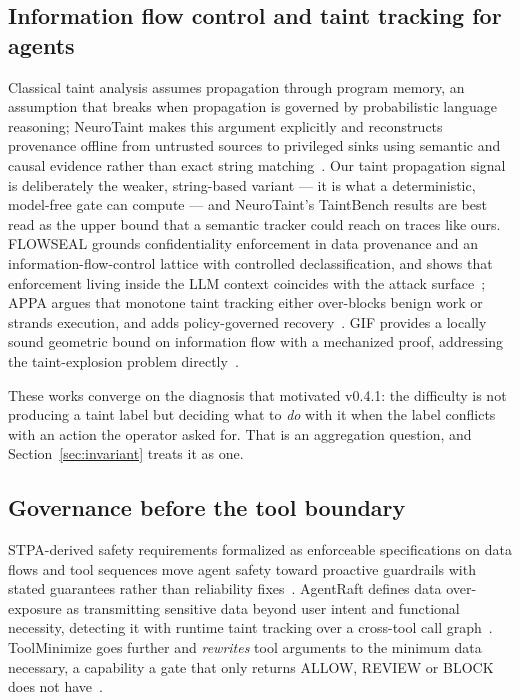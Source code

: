 \documentclass[letterpaper,twocolumn,10pt]{article}
\begin{document}
\subsection{Information flow control and taint tracking for agents}
\label{sec:rw:ifc}

Classical taint analysis assumes propagation through program memory, an
assumption that breaks when propagation is governed by probabilistic language
reasoning; NeuroTaint makes this argument explicitly and reconstructs
provenance offline from untrusted sources to privileged sinks using semantic
and causal evidence rather than exact string matching~\cite{cai2026ghost}. Our
taint propagation signal is deliberately the weaker, string-based variant ---
it is what a deterministic, model-free gate can compute --- and NeuroTaint's
TaintBench results are best read as the upper bound that a semantic tracker
could reach on traces like ours. FLOWSEAL grounds confidentiality enforcement
in data provenance and an information-flow-control lattice with controlled
declassification, and shows that enforcement living inside the LLM context
coincides with the attack surface~\cite{shim2026confuse}; APPA argues that
monotone taint tracking either over-blocks benign work or strands execution,
and adds policy-governed recovery~\cite{kravchenko2026appa}. GIF provides a
locally sound geometric bound on information flow with a mechanized proof,
addressing the taint-explosion problem directly~\cite{storek2026gif}.

These works converge on the diagnosis that motivated v0.4.1: the difficulty is
not producing a taint label but deciding what to \emph{do} with it when the
label conflicts with an action the operator asked for. That is an aggregation
question, and Section~\ref{sec:invariant} treats it as one.

\subsection{Governance before the tool boundary}
\label{sec:rw:boundary}

STPA-derived safety requirements formalized as enforceable specifications on
data flows and tool sequences move agent safety toward proactive guardrails
with stated guarantees rather than reliability
fixes~\cite{doshi2026verifiably}. AgentRaft defines data over-exposure as
transmitting sensitive data beyond user intent and functional necessity,
detecting it with runtime taint tracking over a cross-tool call
graph~\cite{lin2026agentraft}. ToolMinimize goes further and \emph{rewrites}
tool arguments to the minimum data necessary, a capability a gate that only
returns ALLOW, REVIEW or BLOCK does not have~\cite{li2026toolminimize}.
\end{document}

